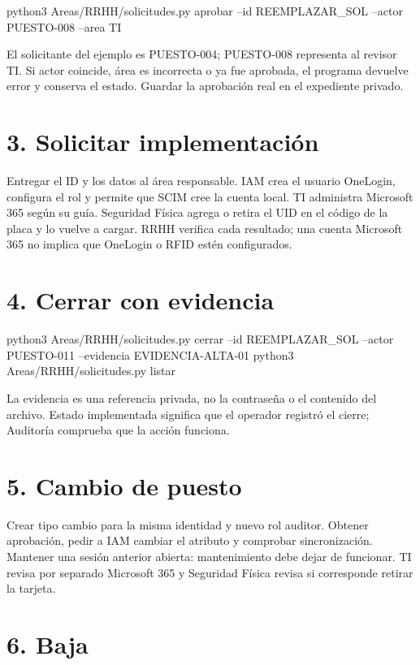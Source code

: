 \documentclass[12pt,a4paper]{article}
\begin{document}
\begin{Comandos}
python3 Areas/RRHH/solicitudes.py aprobar --id REEMPLAZAR_SOL --actor PUESTO-008 --area TI
\end{Comandos}
El solicitante del ejemplo es PUESTO-004; PUESTO-008 representa al revisor TI. Si actor coincide, área es incorrecta o ya fue aprobada, el programa devuelve error y conserva el estado. Guardar la aprobación real en el expediente privado.\par
{}\section*{3. Solicitar implementación}
Entregar el ID y los datos al área responsable. IAM crea el usuario OneLogin, configura el rol y permite que SCIM cree la cuenta local. TI administra Microsoft 365 según su guía. Seguridad Física agrega o retira el UID en el código de la placa y lo vuelve a cargar. RRHH verifica cada resultado; una cuenta Microsoft 365 no implica que OneLogin o RFID estén configurados.\par
{}\section*{4. Cerrar con evidencia}
\begin{Comandos}
python3 Areas/RRHH/solicitudes.py cerrar --id REEMPLAZAR_SOL --actor PUESTO-011 --evidencia EVIDENCIA-ALTA-01
python3 Areas/RRHH/solicitudes.py listar
\end{Comandos}
La evidencia es una referencia privada, no la contraseña o el contenido del archivo. Estado implementada significa que el operador registró el cierre; Auditoría comprueba que la acción funciona.\par
{}\section*{5. Cambio de puesto}
Crear tipo cambio para la misma identidad y nuevo rol auditor. Obtener aprobación, pedir a IAM cambiar el atributo y comprobar sincronización. Mantener una sesión anterior abierta: mantenimiento debe dejar de funcionar. TI revisa por separado Microsoft 365 y Seguridad Física revisa si corresponde retirar la tarjeta.\par
{}\section*{6. Baja}
\end{document}
